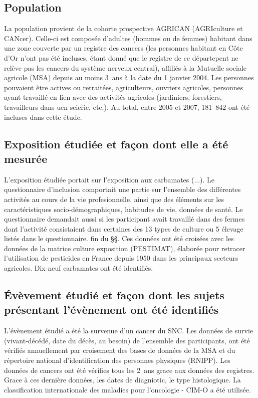 \documentclass[10pt]{article}
\begin{document}
\subsection{Population}
La population provient de la cohorte prospective AGRICAN (AGRIculture et CANcer). Celle-ci est composée d'adultes (hommes ou de femmes) habitant dans une zone couverte par un registre des cancers (les personnes habitant en Côte d'Or n'ont pas été incluses, étant donné que le registre de ce départepent ne relève pas les cancers du système nerveux central), affiliés à la Mutuelle sociale agricole (MSA) depuis au moins 3~ans à la date du 1 janvier 2004. Les personnes pouvaient être actives ou retraitées, agriculteurs, ouvriers agricoles, personnes ayant travaillé en lien avec des activités agricoles (jardiniers, forestiers, travailleurs dans uen scierie, etc.). Au total, entre 2005 et 2007, 181~842 ont été incluses dans cette étude.

\subsection{Exposition étudiée et façon dont elle a été mesurée}
\label{exposition}
L'exposition étudiée portait sur l'exposition aux carbamates (...). Le questionnaire d'inclusion comportait une partie sur l'ensemble des différentes activités au cours de la vie profesionnelle, ainsi que des éléments sur les caractéristiques socio-démographiques, habitudes de vie, données de santé. Le questionnaire demandait aussi si les participant avait travaillé dans des fermes dont l'activité consistaient dans certaines des 13 types de culture ou 5 élevage listés dans le questionnaire. fin du §§. Ces données ont été croisées avec les données de la matrice culture exposition (PESTIMAT), élaborée pour retracer l'utilisation de pesticides en France depuis 1950 dans les principaux secteurs agricoles. Dix-neuf carbamates ont été identifiés.

\subsection{\'{E}vèvement étudié et façon dont les sujets présentant l'évènement ont été identifiés}
L'évènement étudié a été la survenue d'un cancer du SNC. Les données de survie (vivant-décédé, date du décès, au besoin) de l'ensemble des participants, ont été vérifiés annuellement par croisement des bases de données de la MSA et du répertoire national d'identification des personnes physiques (RNIPP). Les données de cancers ont été vérifies tous les 2~ans grace aux données des registres. Grace à ces dernière données, les dates de diagniotic, le type histologique. La classification internationale des maladies pour l'oncologie - CIM-O a été utilisée.
\end{document}
